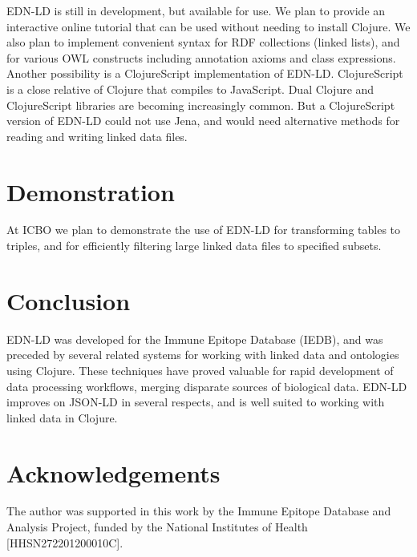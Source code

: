\documentclass{icbo}
\begin{document}
EDN-LD is still in development, but available for use. We plan to provide an interactive online tutorial that can be used without needing to install Clojure. We also plan to implement convenient syntax for RDF collections (linked lists), and for various OWL constructs including annotation axioms and class expressions. Another possibility is a ClojureScript implementation of EDN-LD. ClojureScript is a close relative of Clojure that compiles to JavaScript. Dual Clojure and ClojureScript libraries are becoming increasingly common. But a ClojureScript version of EDN-LD could not use Jena, and would need alternative methods for reading and writing linked data files.


\section{Demonstration}

At ICBO we plan to demonstrate the use of EDN-LD for transforming tables to triples, and for efficiently filtering large linked data files to specified subsets.


\section{Conclusion}

EDN-LD was developed for the Immune Epitope Database (IEDB), and was preceded by several related systems for working with linked data and ontologies using Clojure. These techniques have proved valuable for rapid development of data processing workflows, merging disparate sources of biological data. EDN-LD improves on JSON-LD in several respects, and is well suited to working with linked data in Clojure.


\section*{Acknowledgements}

The author was supported in this work by the Immune Epitope Database and Analysis Project, funded by the National Institutes of Health [HHSN272201200010C].





\end{document}

